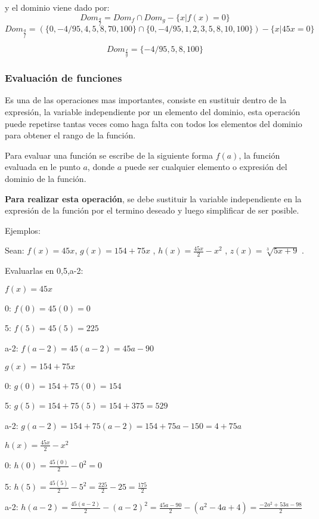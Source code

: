     y el dominio viene dado por:
    $$ Dom_{\frac{g}{f}}= Dom_f \cap Dom_g -\{x|f(x)=0\}$$
    $$ Dom_{\frac{g}{f} } =  (\{0,-4/95,4,5,8,70,100\} \cap \{0,-4/95,1,2,3,5,8,10,100\}) -\{x|45x=0 \}$$

    $$Dom_{\frac{f}{g} }=\{-4/95,5,8,100\} $$

\subsubsection*{Evaluación de funciones} \label{Evaluacion_de_funciones}

Es una de las operaciones mas importantes, consiste en sustituir dentro de la
expresión, la variable independiente por un elemento del dominio, esta operación
puede repetirse tantas veces como haga falta con todos los elementos del dominio
para obtener el rango de la función.

Para evaluar una función se escribe de la siguiente forma $ f(a) $, la función
evaluada en le punto $a$, donde $a$ puede ser cualquier elemento o expresión
del dominio de la función.

\textbf{Para realizar esta operación}, se debe sustituir la variable independiente
en la expresión de la función por el termino deseado y luego simplificar de ser
posible.

    Ejemplos:

    Sean:
    $f(x)= 45x$,
    $ g(x)=154 + 75x $  ,
    $ h(x)=\frac{45x}{2} - x^2 $  ,
    $ z(x) = \sqrt[3]{5x+9}  $  .

    Evaluarlas en {0,5,a-2}:

    $f(x)= 45x$

    0: $ f(0)= 45(0)=0$

    5: $ f(5)=45(5)=225 $

    a-2: $ f(a-2)= 45(a-2)=45a-90 $


    $ g(x)=154 + 75x $

    0: $ g(0)=154+75(0)=154 $

    5:  $ g(5)=154+75(5)=154+375=529 $

    a-2: $ g(a-2)=154+75(a-2)=154+75a-150=4+75a $


    $ h(x)=\frac{45x}{2} - x^2 $

    0: $ h(0)=\frac{45(0)}{2} - 0^2 = 0$


    5: $ h(5)=\frac{45(5)}{2} - 5^2 =\frac{225}{2}- 25=\frac{175}{2}  $


    a-2: $ h(a-2)=\frac{45(a-2)}{2} - (a-2)^2= \frac{45a-90}{2} -(a^2-4a+4)=\frac{-2a^2+53a-98}{2}  $


